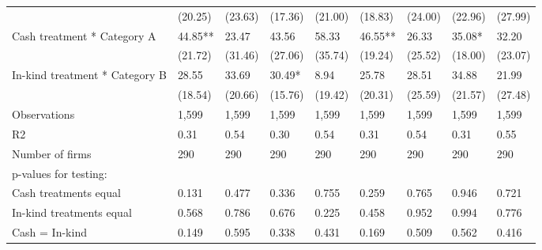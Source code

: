 \documentclass{report}
\begin{document}
\begin{table}[H]
{\begin{tabular}{lllllllll}
\hspace{1em} & (20.25) & (23.63) & (17.36) & (21.00) & (18.83) & (24.00) & (22.96) & (27.99)\\
\hspace{1em}Cash treatment * Category A & 44.85** & 23.47 & 43.56 & 58.33 & 46.55** & 26.33 & 35.08* & 32.20\\
\hspace{1em} & (21.72) & (31.46) & (27.06) & (35.74) & (19.24) & (25.52) & (18.00) & (23.07)\\
\hspace{1em}In-kind treatment * Category B & 28.55 & 33.69 & 30.49* & 8.94 & 25.78 & 28.51 & 34.88 & 21.99\\
\hspace{1em} & (18.54) & (20.66) & (15.76) & (19.42) & (20.31) & (25.59) & (21.57) & (27.48)\\
\hspace{1em}Observations & 1,599 & 1,599 & 1,599 & 1,599 & 1,599 & 1,599 & 1,599 & 1,599\\
\hspace{1em}R2 & 0.31 & 0.54 & 0.30 & 0.54 & 0.31 & 0.54 & 0.31 & 0.55\\
\hspace{1em}Number of firms & 290 & 290 & 290 & 290 & 290 & 290 & 290 & 290\\
\hspace{1em}p-values for testing: &  &  &  &  &  &  &  & \\
\hspace{1em}\hspace{1em} Cash treatments equal & 0.131 & 0.477 & 0.336 & 0.755 & 0.259 & 0.765 & 0.946 & 0.721\\
\hspace{1em}\hspace{1em} In-kind treatments equal & 0.568 & 0.786 & 0.676 & 0.225 & 0.458 & 0.952 & 0.994 & 0.776\\
\hspace{1em}\hspace{1em} Cash = In-kind & 0.149 & 0.595 & 0.338 & 0.431 & 0.169 & 0.509 & 0.562 & 0.416\\
\bottomrule
\end{tabular}}
\end{table}
\end{document}
